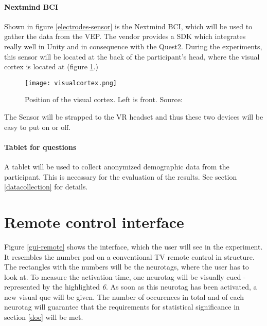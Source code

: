             \paragraph{Nextmind BCI}                

                Shown in figure \ref*{electrodes-sensor} is the Nextmind BCI, which will be used to gather the data from the VEP. The vendor provides a SDK which integrates really well in Unity and in consequence with the Quest2. During the experiments, this sensor will be located at the back of the participant's head, where the visual cortex is located at (figure \ref*{visual-cortex}.)

                \begin{figure}[h]     %
                    \centering
                    \texttt{[image: visualcortex.png]} 
                    \caption{Position of the visual cortex. Left is front. Source: \cite{Dr.KenBrodaBahm.14062021}}\label{visual-cortex}
                \end{figure}

                The Sensor will be strapped to the VR headset and thus these two devices will be easy to put on or off.

            \paragraph{Tablet for questions}

                A tablet will be used to collect anonymized demographic data from the participant. This is necessary for the evaluation of the results. See section \ref*{datacollection} for details.

        \section{Remote control interface}
        
            Figure \ref*{gui-remote} shows the interface, which the user will see in the experiment. It resembles the number pad on a conventional TV remote control in structure. The rectangles with the numbers will be the neurotags, where the user has to look at. To measure the activation time, one neurotag will be visually cued - represented by the highlighted \textit{6}. As soon as this neurotag has been activated, a new visual que will be given. The number of occurences in total and of each neurotag will guarantee that the requirements for statistical significance in section \ref*{doe} will be met.

